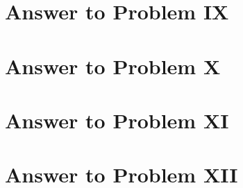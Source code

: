 \documentclass[11pt,a4paper]{article}
\begin{document}
\section{Answer to Problem IX}\label{sec:P09}



\clearpage

\section{Answer to Problem X}\label{sec:P10}



\clearpage

\section{Answer to Problem XI}\label{sec:P11}



\clearpage

\section{Answer to Problem XII}\label{sec:P12}



\clearpage


\printbibliography

\end{document}
